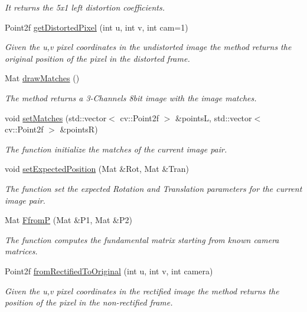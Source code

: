 \begin{DoxyCompactItemize}
\begin{DoxyCompactList}\small\item\em It returns the 5x1 left distortion coefficients. \end{DoxyCompactList}\item 
Point2f \mbox{\hyperlink{classStereoCamera_af64550bb8a7a665930dee5eea87b7e47}{get\+Distorted\+Pixel}} (int u, int v, int cam=1)
\begin{DoxyCompactList}\small\item\em Given the u,v pixel coordinates in the undistorted image the method returns the original position of the pixel in the distorted frame. \end{DoxyCompactList}\item 
Mat \mbox{\hyperlink{classStereoCamera_a6580ff03c7cec5c385ec717f9c018e21}{draw\+Matches}} ()
\begin{DoxyCompactList}\small\item\em The method returns a 3-\/Channels 8bit image with the image matches. \end{DoxyCompactList}\item 
void \mbox{\hyperlink{classStereoCamera_ae683fafa11ea73e4b4c278402be259b6}{set\+Matches}} (std\+::vector$<$ cv\+::\+Point2f $>$ \&pointsL, std\+::vector$<$ cv\+::\+Point2f $>$ \&pointsR)
\begin{DoxyCompactList}\small\item\em The function initialize the matches of the current image pair. \end{DoxyCompactList}\item 
void \mbox{\hyperlink{classStereoCamera_a9ecb303d7b36eaf5f086d8ddebd29b95}{set\+Expected\+Position}} (Mat \&Rot, Mat \&Tran)
\begin{DoxyCompactList}\small\item\em The function set the expected Rotation and Translation parameters for the current image pair. \end{DoxyCompactList}\item 
Mat \mbox{\hyperlink{classStereoCamera_a3fe4e87322f8644cd21ce06e8522c815}{FfromP}} (Mat \&P1, Mat \&P2)
\begin{DoxyCompactList}\small\item\em The function computes the fundamental matrix starting from known camera matrices. \end{DoxyCompactList}\item 
Point2f \mbox{\hyperlink{classStereoCamera_a3d8fde0cbd4604085b883f22cc606c01}{from\+Rectified\+To\+Original}} (int u, int v, int camera)
\begin{DoxyCompactList}\small\item\em Given the u,v pixel coordinates in the rectified image the method returns the position of the pixel in the non-\/rectified frame. \end{DoxyCompactList}\end{DoxyCompactItemize}


